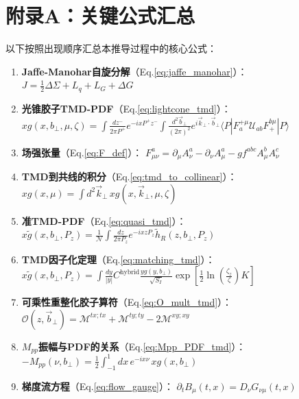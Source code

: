 \documentclass[12pt,a4paper]{ctexart}
\theoremstyle{definition}
\newcommand{\hR}{\tilde{h}_R}
\newcommand{\Pz}{P_z}
\newcommand{\bperp}{b_\perp}
\begin{document}
\section*{附录A：关键公式汇总}

以下按照出现顺序汇总本推导过程中的核心公式：

\begin{enumerate}[label=(A\arabic*), leftmargin=*]
    \item \textbf{Jaffe-Manohar自旋分解}（Eq.\ref{eq:jaffe_manohar}）：
    $J = \frac{1}{2}\Delta\Sigma + L_q + L_G + \Delta G$

    \item \textbf{光锥胶子TMD-PDF}（Eq.\ref{eq:lightcone_tmd}）：
    $x g(x, \bperp, \mu, \zeta) = \int \frac{dz^-}{2\pi P^+} e^{-ixP^+z^-} \int \frac{d^2\vec{b}_\perp}{(2\pi)^2} e^{i\vec{k}_\perp\cdot\vec{b}_\perp} \langle P | F^{+\mu}_a \mathcal{U}_{ab} F^{b\mu}_{+} | P \rangle$

    \item \textbf{场强张量}（Eq.\ref{eq:F_def}）：
    $F^a_{\mu\nu} = \partial_\mu A^a_\nu - \partial_\nu A^a_\mu - g f^{abc} A^b_\mu A^c_\nu$

    \item \textbf{TMD到共线的积分}（Eq.\ref{eq:tmd_to_collinear}）：
    $x g(x, \mu) = \int d^2\vec{k}_\perp \, x g(x, \vec{k}_\perp, \mu, \zeta)$

    \item \textbf{准TMD-PDF}（Eq.\ref{eq:quasi_tmd}）：
    $x\tilde{g}(x, \bperp, \Pz) = \frac{1}{\mathcal{N}} \int \frac{dz}{2\pi\Pz} e^{-ixz\Pz} \hR(z, \bperp, \Pz)$

    \item \textbf{TMD因子化定理}（Eq.\ref{eq:matching_tmd}）：
    $x\tilde{g}(x, \bperp, \Pz) = \int \frac{dy}{|y|} C^{\text{hybrid}} \frac{y g(y, \bperp)}{\sqrt{S_I}} \exp[\frac{1}{2}\ln(\frac{\zeta_z}{\zeta})K]$

    \item \textbf{可乘性重整化胶子算符}（Eq.\ref{eq:O_mult_tmd}）：
    $\mathcal{O}(z, \vec{b}_\perp) = \mathcal{M}^{tx;tx} + \mathcal{M}^{ty;ty} - 2\mathcal{M}^{xy;xy}$

    \item \textbf{$M_{pp}$振幅与PDF的关系}（Eq.\ref{eq:Mpp_PDF_tmd}）：
    $-M_{pp}(\nu, \bperp) = \frac{1}{2} \int_{-1}^{1} dx \, e^{-ix\nu} \, x g(x, \bperp)$

    \item \textbf{梯度流方程}（Eq.\ref{eq:flow_gauge}）：
    $\partial_t B_\mu(t,x) = D_\nu G_{\nu\mu}(t,x)$


\end{enumerate}
\end{document}
